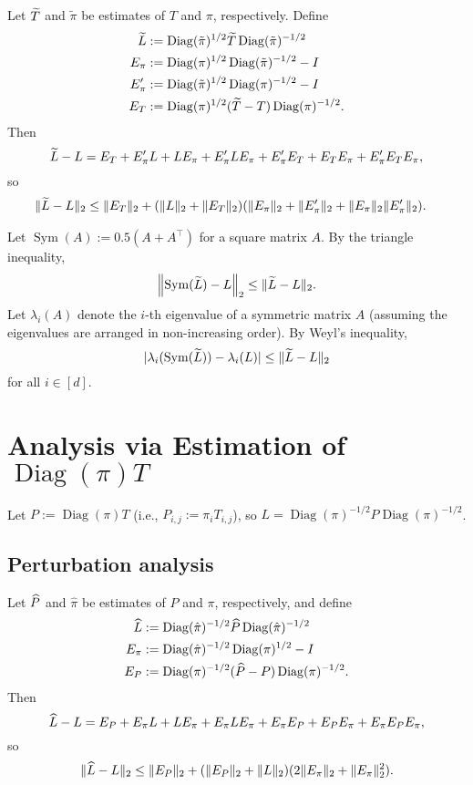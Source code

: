 \documentclass[11pt]{article}
\theoremstyle{plain}
\theoremstyle{definition}
\theoremstyle{remark}
\newcommand\wh{\ensuremath{\widehat}}
\newcommand\wt{\ensuremath{\widetilde}}
\newcommand\norm[1]{\left\| #1 \right\|}
\DeclareMathOperator{\Diag}{Diag}
\DeclareMathOperator{\Sym}{Sym}
\renewcommand\t{{\ensuremath{\scriptscriptstyle{\top}}}}
\begin{document}
Let $\wt{T}$ and $\tilde\pi$ be estimates of $T$ and $\pi$,
respectively.
Define
\begin{align*}
  \wt{L}
  & := \Diag(\tilde\pi)^{1/2} \wt{T} \Diag(\tilde\pi)^{-1/2}
  \\
  E_\pi & := \Diag(\pi)^{1/2} \Diag(\tilde\pi)^{-1/2} - I \\
  E_\pi' & := \Diag(\tilde\pi)^{1/2} \Diag(\pi)^{-1/2} - I \\
  E_T & := \Diag(\pi)^{1/2} (\wt{T} - T) \Diag(\pi)^{-1/2} .
\end{align*}
Then
\[
  \wt{L} - L
  = E_T + E_\pi' L + L E_\pi + E_\pi' L E_\pi
  + E_\pi' E_T + E_T E_\pi + E_\pi' E_T E_\pi
  ,
\]
so
\begin{align*}
  \|\wt{L} - L\|_2
  & \leq \|E_T\|_2
  + (\|L\|_2 + \|E_T\|_2)
  (\|E_\pi\|_2 + \|E_\pi'\|_2 + \|E_\pi\|_2\|E_\pi'\|_2)
  .
\end{align*}

Let $\Sym(A) := 0.5 (A + A^\t)$ for a square matrix $A$.
By the triangle inequality,
\[
  \norm{\Sym(\wt{L}) - L}_2
  \leq \|\wt{L} - L\|_2 .
\]
Let $\lambda_i(A)$ denote the $i$-th eigenvalue of a symmetric matrix
$A$ (assuming the eigenvalues are arranged in non-increasing order).
By Weyl's inequality,
\[
  |\lambda_i(\Sym(\wt{L})) - \lambda_i(L)| \leq
  \|\wt{L} - L\|_2
\]
for all $i\in[d]$.

\section{Analysis via Estimation of $\Diag(\pi)T$}

Let $P := \Diag(\pi) T$ (i.e., $P_{i,j} := \pi_i T_{i,j}$), so $L =
\Diag(\pi)^{-1/2} P \Diag(\pi)^{-1/2}$.

\subsection{Perturbation analysis}

Let $\wh{P}$ and $\hat\pi$ be estimates of $P$ and $\pi$,
respectively, and define
\begin{align*}
  \wh{L} & := \Diag(\hat\pi)^{-1/2} \wh{P} \Diag(\hat\pi)^{-1/2} \\
  E_\pi & := \Diag(\hat\pi)^{-1/2} \Diag(\pi)^{1/2} - I \\
  E_P & := \Diag(\pi)^{-1/2} (\wh{P} - P) \Diag(\pi)^{-1/2} .
\end{align*}
Then
\[
  \wh{L} - L
  = E_P + E_\pi L + L E_\pi + E_\pi L E_\pi + E_\pi E_P + E_P E_\pi +
  E_\pi E_P E_\pi
  ,
\]
so
\[
  \|\wh{L} - L\|_2
  \leq \|E_P\|_2 + (\|E_P\|_2 + \|L\|_2) (2\|E_\pi\|_2 + \|E_\pi\|_2^2)
  .
\]
\end{document}
